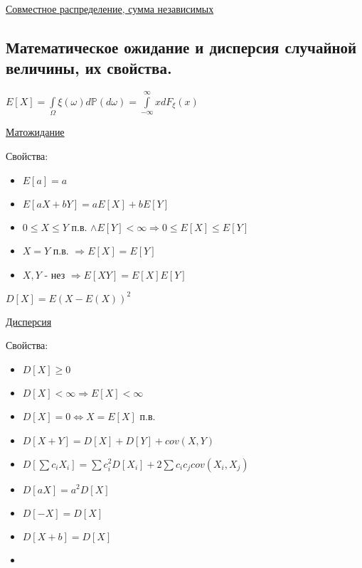 \documentclass{article}
\begin{document}
\href{https://mipt.ru/education/chair/mathematics/study/methods/%D0%A1%D0%A0%D0%A1%D0%92_%D0%A1%D0%B0%D0%BC%D0%BE%D1%80%D0%BE%D0%B2%D0%B0(2).pdf}{Совместное распределение, сумма независимых}


\subsection{Математическое ожидание и дисперсия случайной величины, их
свойства.}

$E[X] = \int\limits_{\Omega} \xi(\omega) d \mathbb{P}(d \omega) =
\int\limits_{-\infty}^\infty x d F_\xi(x)$

\href{https://ru.wikipedia.org/wiki/%D0%9C%D0%B0%D1%82%D0%B5%D0%BC%D0%B0%D1%82%D0%B8%D1%87%D0%B5%D1%81%D0%BA%D0%BE%D0%B5_%D0%BE%D0%B6%D0%B8%D0%B4%D0%B0%D0%BD%D0%B8%D0%B5}{Матожидание}

Свойства:
\begin{itemize}
    \item $E[a] = a$
    \item $E[a X + b Y] = a E[X] + b E[Y]$
    \item $0 \leq X \leq Y$ п.в. $\wedge E[Y] < \infty \Rightarrow 0 \leq E[X] \leq E[Y]$
    \item $X = Y$ п.в. $\Rightarrow E[X] = E[Y]$
    \item $X, Y$ - нез $\Rightarrow E[XY] = E[X] E[Y]$
\end{itemize}

$D[X] = E(X - E(X))^2$

\href{https://ru.wikipedia.org/wiki/%D0%94%D0%B8%D1%81%D0%BF%D0%B5%D1%80%D1%81%D0%B8%D1%8F_%D1%81%D0%BB%D1%83%D1%87%D0%B0%D0%B9%D0%BD%D0%BE%D0%B9_%D0%B2%D0%B5%D0%BB%D0%B8%D1%87%D0%B8%D0%BD%D1%8B}{Дисперсия}

Свойства:
\begin{itemize}
    \item $D[X] \geq 0$
    \item $D[X] < \infty \Rightarrow E[X] < \infty$
    \item $D[X] = 0 \iff X = E[X]$ п.в.
    \item $D[X + Y] = D[X] + D[Y] + cov(X, Y)$
    \item $D[\sum c_i X_i] = \sum c_i^2 D[X_i] + 2 \sum c_i c_j cov(X_i, X_j)$
    \item $D[a X] = a^2 D[X]$
    \item $D[-X] = D[X]$
    \item $D[X + b] = D[X]$
    \item 
\end{itemize}
\end{document}

